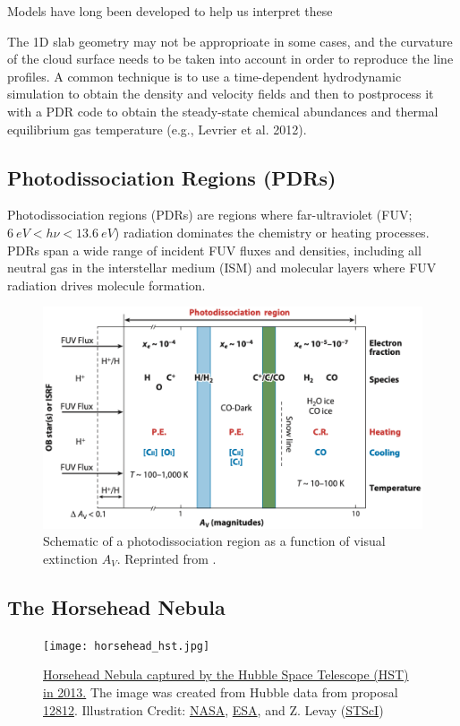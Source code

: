 \documentclass[12pt,a4paper]{article}
\begin{document}
Models have long been developed to help us interpret these


The 1D slab geometry may not be approprioate in some cases, and the curvature of the cloud surface needs to be taken into account in order to reproduce the line profiles. A common technique is to use a time-dependent hydrodynamic simulation to obtain the density and velocity fields and then to postprocess it with a PDR code to obtain the steady-state chemical abundances and thermal equilibrium gas temperature (e.g., Levrier et al. 2012).

\subsection{Photodissociation Regions (PDRs)}
Photodissociation regions (PDRs) are regions where far-ultraviolet (FUV; $\qty{6}{eV} < h\nu < \qty{13.6}{eV}$) radiation dominates the chemistry or heating processes\parencite{Tielens1985}. PDRs span a wide range of incident FUV fluxes and densities, including all neutral gas in the interstellar medium (ISM) and molecular layers where FUV radiation drives molecule formation.

\begin{figure}
    \centering
    \includegraphics[width=.7\textwidth,keepaspectratio]{figures/PDRScheme_Wolfire2022fig2.png}
    \caption{Schematic of a photodissociation region as a function of visual extinction $A_V$. Reprinted from \textcite{Wolfire2022}.}
\end{figure}
\subsection{The Horsehead Nebula}
\begin{figure}
    \centering
    \texttt{[image: horsehead\_hst.jpg]}
    \caption{\href{https://hubblesite.org/contents/media/images/2013/12/3166-Image.html?keyword=Horsehead}{Horsehead Nebula captured by the Hubble Space Telescope (HST) in 2013.} The image was created from Hubble data from proposal \href{http://archive.stsci.edu/proposal_search.php?mission=hst&id=12812}{12812}. Illustration Credit: \href{http://www.nasa.gov/}{NASA}, \href{http://www.spacetelescope.org/}{ESA}, and Z. Levay (\href{http://www.stsci.edu/}{STScI})} 
\end{figure}
\end{document}
